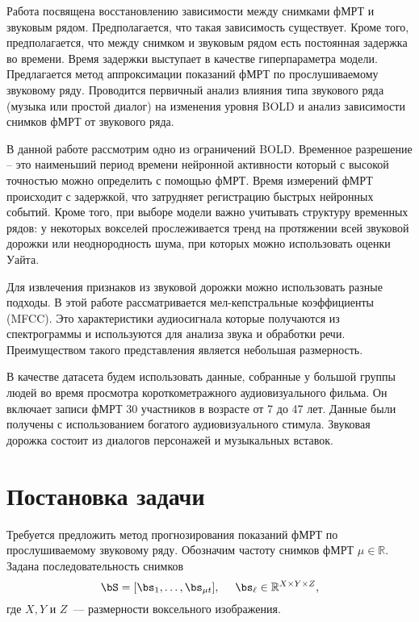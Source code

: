 \documentclass[12pt, twoside]{article}
\begin{document}
Работа посвящена восстановлению зависимости между снимками фМРТ
и звуковым рядом. Предполагается, что такая зависимость существует. Кроме того, предполагается, что между снимком и звуковым рядом есть постоянная задержка во
времени\citep{menon1999spatial}. Время задержки выступает в качестве гиперпараметра модели. Предлагается метод аппроксимации показаний фМРТ по прослушиваемому звуковому ряду. Проводится первичный анализ влияния типа звукового ряда (музыка или простой диалог) на изменения уровня BOLD и анализ зависимости снимков фМРТ от звукового ряда.

В данной работе рассмотрим одно из ограничений BOLD\citep{menon1999spatial}. Временное разрешение -- это наименьший период времени нейронной активности который с высокой точностью можно определить с помощью фМРТ. Время измерений фМРТ происходит с задержкой, что затрудняет регистрацию быстрых нейронных событий. Кроме того, при выборе модели важно учитывать структуру временных рядов: у некоторых вокселей прослеживается тренд на протяжении всей звуковой дорожки или неоднородность шума, при которых можно использовать оценки Уайта\citep{hetero}.

Для извлечения признаков из звуковой дорожки можно использовать разные подходы\citep{audiofeaturetrends}. В этой работе рассматривается мел-кепстральные коэффициенты (MFCC). Это характеристики аудиосигнала которые получаются из спектрограммы и используются для анализа звука и обработки речи. Преимуществом такого представления является небольшая размерность.

В качестве датасета будем использовать данные\citep{Berezutskaya2022}, собранные у большой группы людей во время просмотра короткометражного аудиовизуального фильма. Он включает записи фМРТ 30 участников в возрасте от 7 до 47 лет. Данные были получены с использованием богатого аудиовизуального стимула. Звуковая дорожка состоит из диалогов персонажей и музыкальных вставок.


\section{Постановка задачи}
Требуется предложить метод прогнозирования показаний фМРТ по прослушиваемому звуковому ряду. 
Обозначим частоту снимков фМРТ $\mu \in \mathbb{R}$. Задана последовательность снимков
\begin{equation}
	\label{eq1}
	\bS = [\bs_1, \ldots, \bs_{\mu t}], \quad\
	\bs_{\ell} \in \mathbb{R}^{X \times Y \times Z},
\end{equation}
где $X, Y$ и $Z$~--- размерности воксельного изображения.
\end{document}
